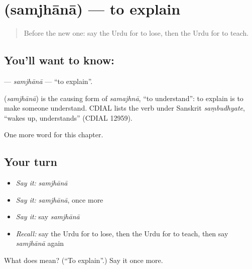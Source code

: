 \section[\texorpdfstring{\ur{سمجھانا} (samjhānā)}{سمجھانا (samjhānā)}]{ (samjhānā) — to explain}

\label{lesson:UR-C140-samjhana}



\begin{quote}
Before the new one: say the Urdu for to lose, then the Urdu for to teach.
\end{quote}

\subsection*{You'll want to know: }
\textbf{} — \emph{samjhānā} — \textquotedblleft{}to explain\textquotedblright{}.

\begin{cousinweb}
\textbf{} (\emph{samjhānā}) is the causing form of \emph{samajhnā}, \textquotedblleft{}to understand\textquotedblright{}: to explain is to make someone understand. CDIAL lists the verb under Sanskrit \emph{saṃbudhyate}, \textquotedblleft{}wakes up, understands\textquotedblright{} (CDIAL 12959).
\end{cousinweb}

\begin{grammarlens}[title={What you've built}]
One more word for this chapter.
\end{grammarlens}

\subsection*{Your turn}
\begin{itemize}
\raggedright
  \item \emph{Say it:} \emph{samjhānā}
  \item \emph{Say it:} \emph{samjhānā}, once more
  \item \emph{Say it:} say \emph{samjhānā}
  \item \emph{Recall:} say the Urdu for to lose, then the Urdu for to teach, then say \emph{samjhānā} again
\end{itemize}

\begin{tcolorbox}[breakable,colback=teal!4,colframe=teal!35!black,title={Before you move on}]
What does  mean? (\textquotedblleft{}To explain\textquotedblright{}.) Say it once more.
\end{tcolorbox}
